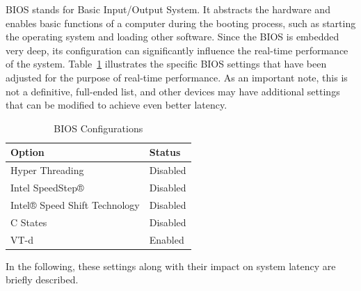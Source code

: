 \documentclass[MMR,Master,english]{twbook}
\begin{document}
BIOS stands for Basic Input/Output System. It abstracts the hardware and enables basic functions of a computer during the booting process, such as starting the operating system and loading other software. Since the BIOS is embedded very deep, its configuration can significantly influence the real-time performance of the system. Table~\ref{tab:bios_configuration} illustrates the specific BIOS settings that have been adjusted for the purpose of real-time performance. As an important note, this is not a definitive, full-ended list, and other devices may have additional settings that can be modified to achieve even better latency.

\begin{table}[H]
	\centering
	\caption{BIOS Configurations}
	\label{tab:bios_configuration}
	\setlength{\tabcolsep}{0.5em} %
	{\renewcommand{\arraystretch}{1.2}%
		\begin{tabular}{|l|l|}
			\hline
			\textbf{Option}               & \textbf{Status} \\
			\hline
			Hyper Threading               & Disabled        \\
			\hline
			Intel SpeedStep®              & Disabled        \\
			\hline
			Intel® Speed Shift Technology & Disabled        \\
			\hline
			C States                      & Disabled        \\
			\hline
			VT-d                          & Enabled         \\
			\hline
		\end{tabular}}
\end{table}

\noindent In the following, these settings along with their impact on system latency are briefly described.
\end{document}
